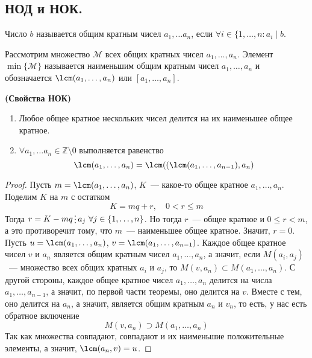 \documentclass[11pt]{article}
\begin{document}
\subsection{НОД и НОК.}
\begin{definition}
	Число $b$ называется общим кратным чисел $a_1, \ldots a_n$, если $\forall i \in \{ 1, \ldots, n\colon a_i \mid b$.
\end{definition}
\begin{definition}
	Рассмотрим множество $\mathcal{M}$ всех общих кратных чисел $a_1, \ldots, a_n$. Элемент $\min\{\mathcal{M}\}$ называется наименьшим общим кратным чисел $a_1, \ldots, a_n$
	и обозначается $\lcm(a_1, \ldots, a_n)$ или $[a_1, \ldots, a_n]$.
\end{definition}
\begin{theorem}\textbf{(Свойства НОК)}
\begin{enumerate}
    \item Любое общее кратное нескольких чисел делится на их наименьшее общее кратное.

	\item $\forall a_{1}, \ldots a_n \in \mathbb{Z}\setminus{0}$ выполняется равенство
		  \[ \lcm(a_1, \ldots, a_n) = \lcm((\lcm(a_1, \ldots, a_{n - 1}), a_n ) \]
\end{enumerate}
\end{theorem}
\begin{proof}
	Пусть $m = \lcm(a_1, \ldots, a_n)$, $K$~--- какое-то общее кратное $a_1, \ldots, a_n$.
	Поделим $K$ на $m$ с остатком
	\[ K = mq + r, \quad 0 < r \le m\]
	Тогда $r = K - mq \divisible a_j \ \forall j \in \{ 1, \ldots, n\}$. Но тогда $r$~--- общее кратное
	и $0 \le r < m$, а это противоречит тому, что $m$~--- наименьшее общее кратное. Значит, $r = 0$.\\

	Пусть $u = \lcm(a_1, \ldots, a_n)$, $v = \lcm(a_1, \ldots, a_{n - 1})$.
	Каждое общее кратное чисел $v$ и $a_n$ является общим кратным чисел $a_1, \ldots, a_n$, а значит, если
	$M(a_i, a_j)$~--- множество всех общих кратных $a_i$ и $a_j$, то $M(v, a_n) \subset M(a_1, \ldots, a_n)$.
	С другой стороны, каждое общее кратное чисел $a_1, \ldots, a_n$ делится на числа $a_1, \ldots, a_{n -1}$, а
	значит, по первой части теоремы, оно делится на $v$. Вместе с тем, оно делится на $a_n$, а значит, является
	общим кратным $a_n$ и $v_n$, то есть, у нас есть обратное включение
	\[ M(v, a_n) \supset M(a_1, \ldots, a_n) \]
	Так как множества совпадают, совпадают и их наименьшие положительные элементы, а значит, $\lcm(a_n, v) = u$.

\end{proof}
\end{document}
